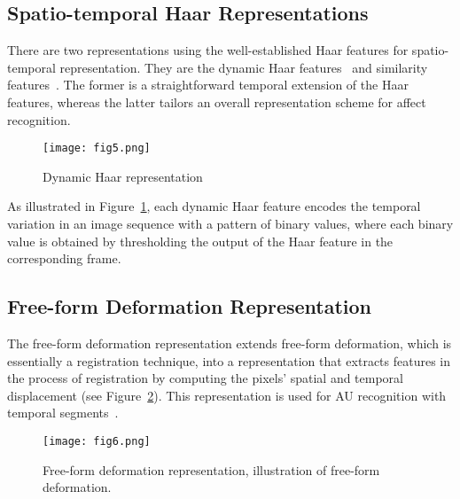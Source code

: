 \documentclass[10pt,twocolumn,letterpaper]{article}
\begin{document}
	\subsection*{Spatio-temporal Haar Representations}
	There are two representations using the well-established Haar features for spatio-temporal representation. They are the dynamic Haar features~\cite{Yang2007} and similarity features~\cite{Yang2008,YANG2011}. The former is a straightforward temporal extension of the Haar features, whereas the latter tailors an overall representation scheme for affect recognition.
	\begin{figure}[h]
		\centering
		\texttt{[image: fig5.png]}
		\caption{Dynamic Haar representation} \label{fig5}
	\end{figure}
	\par
	As illustrated in Figure~\ref{fig5}, each dynamic Haar feature encodes the temporal variation in an image sequence with a pattern of binary values, where each binary value is obtained by thresholding the output of the Haar feature in the corresponding frame.
	\subsection*{Free-form Deformation Representation}
	The free-form deformation representation extends free-form deformation, which is essentially a registration technique, into a representation that extracts features in the process of registration by computing the pixels' spatial and temporal displacement (see Figure~\ref{fig6}). This representation is used for AU recognition with temporal segments~\cite{Koelstra}.
	\begin{figure}[h]
		\centering
		\texttt{[image: fig6.png]}
		\caption{Free-form deformation representation, illustration of free-form deformation.} \label{fig6}
	\end{figure}
\end{document}
